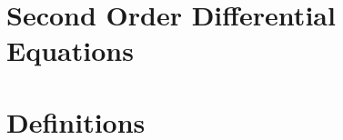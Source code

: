 \documentclass[a4paper,12pt]{article}
\begin{document}
\pagestyle{empty} 

\section{\huge\textbf{Second Order Differential Equations}}


\section{Definitions}
\end{document}
